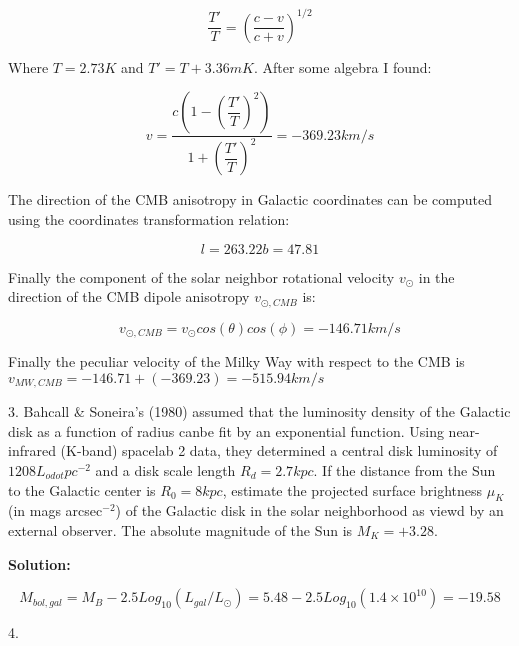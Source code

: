 \documentclass[14pt]{article}
\begin{document}
\begin{equation}
\dfrac{T'}{T} = \left( \dfrac{c-v}{c+v}\right)^{1/2}
\end{equation}

Where $T=2.73K$ and $T'=T+3.36mK$. After some algebra I found:

\begin{equation}
v = \dfrac{c\left (1 - \left (\dfrac{T'}{T}\right )^2 \right )}
{1 + \left (\dfrac{T'}{T}\right )^2} = -369.23 km/s
\end{equation}

The direction of the CMB anisotropy in Galactic coordinates can be
computed using the coordinates transformation relation:

\begin{equation}
l=263.22
b = 47.81
\end{equation}

Finally the component of the solar neighbor rotational velocity
$v_{\odot}$ in the
direction of the CMB dipole anisotropy $v_{\odot, CMB}$ is:

\begin{equation}
v_{\odot, CMB} = v_{\odot} cos(\theta)cos(\phi) = -146.71 km/s
\end{equation}

Finally the peculiar velocity of the Milky Way with respect to the
CMB is $v_{MW, CMB} = -146.71+(-369.23) = -515.94 km/s$

3. Bahcall \& Soneira's (1980) assumed that the luminosity density of
the Galactic disk as a function of radius canbe fit by an exponential
function. Using near-infrared (K-band) spacelab 2 data, they
determined a central disk luminosity of $1208  L_{odot} pc^{-2}$ and a
disk scale length $R_d=2.7 kpc$. If the distance from the Sun to the
Galactic center is $R_0=8kpc$, estimate the projected surface
brightness $\mu_K$ (in mags arcsec$^{-2}$) of the Galactic disk in
the solar neighborhood as viewd by an external observer. The absolute
magnitude of the Sun is $M_K=+3.28$.

\textbf{Solution:}

\begin{equation}
M_{bol, gal} = M_B - 2.5Log_{10}(L_{gal}/L_{\odot}) = 5.48 -
2.5Log_{10}(1.4\times 10^{10}) = -19.58
\end{equation}

4.
\end{document}
